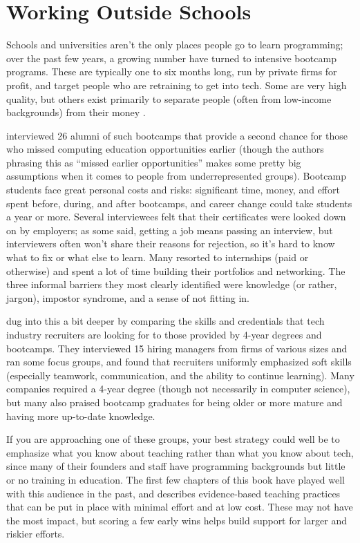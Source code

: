 \section{Working Outside Schools}\label{s:partner-outside}

Schools and universities aren't the only places people go to learn
programming; over the past few years, a growing number have turned to
intensive bootcamp programs.  These are typically one to six months
long, run by private firms for profit, and target people who are
retraining to get into tech.  Some are very high quality, but others
exist primarily to separate people (often from low-income backgrounds)
from their money \cite{McMi2017}.

\cite{Thay2017} interviewed 26 alumni of such bootcamps that provide a
second chance for those who missed computing education opportunities
earlier (though the authors phrasing this as ``missed earlier
opportunities'' makes some pretty big assumptions when it comes to
people from underrepresented groups).  Bootcamp students face great
personal costs and risks: significant time, money, and effort spent
before, during, and after bootcamps, and career change could take
students a year or more.  Several interviewees felt that their
certificates were looked down on by employers; as some said, getting a
job means passing an interview, but interviewers often won't share
their reasons for rejection, so it's hard to know what to fix or what
else to learn.  Many resorted to internships (paid or otherwise) and
spent a lot of time building their portfolios and networking.  The
three informal barriers they most clearly identified were knowledge
(or rather, jargon), impostor syndrome, and a sense of not fitting in.

\cite{Burk2018} dug into this a bit deeper by comparing the skills and
credentials that tech industry recruiters are looking for to those
provided by 4-year degrees and bootcamps.  They interviewed 15 hiring
managers from firms of various sizes and ran some focus groups, and
found that recruiters uniformly emphasized soft skills (especially
teamwork, communication, and the ability to continue learning).  Many
companies required a 4-year degree (though not necessarily in computer
science), but many also praised bootcamp graduates for being older or
more mature and having more up-to-date knowledge.

If you are approaching one of these groups, your best strategy could
well be to emphasize what you know about teaching rather than what you
know about tech, since many of their founders and staff have
programming backgrounds but little or no training in education.  The
first few chapters of this book have played well with this audience in
the past, and \cite{Lang2016} describes evidence-based teaching
practices that can be put in place with minimal effort and at low
cost. These may not have the most impact, but scoring a few early wins
helps build support for larger and riskier efforts.

